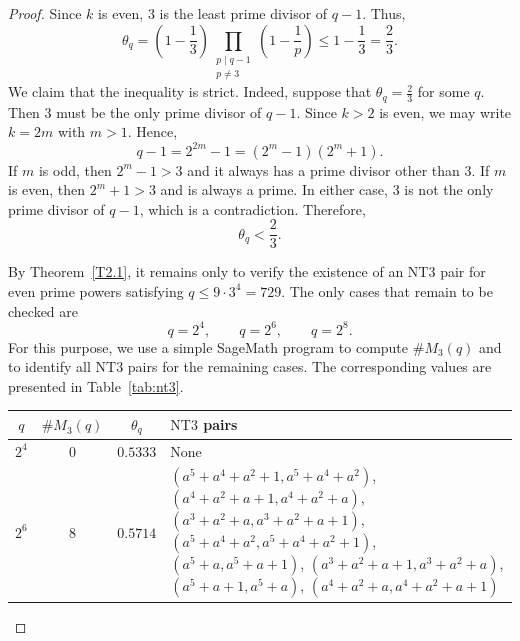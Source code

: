 \documentclass[12pt]{amsart}
\theoremstyle{definition}
\theoremstyle{remark}
\numberwithin{equation}{section}
\begin{document}
\begin{proof}
Since $k$ is even, $3$ is the least prime divisor of $q-1$. Thus,
\[
\theta_q
=
\left(1-\frac{1}{3}\right)
\prod_{\substack{p\mid q-1\\p\neq 3}}
\left(1-\frac{1}{p}\right)
\leq
1-\frac{1}{3}
=
\frac{2}{3}.
\]
We claim that the inequality is strict. Indeed, suppose that $\theta_q=\frac{2}{3}$ for some $q$. Then $3$ must be the only prime divisor of $q-1$. Since $k>2$ is even, we may write $k=2m$ with $m>1$. Hence,
\[
q-1=2^{2m}-1=(2^m-1)(2^m+1).
\]
If $m$ is odd, then $2^m-1>3$ and it always has a prime divisor other than $3$. If $m$ is even, then $2^m+1>3$ and is always a prime. In either case, $3$ is not the only prime divisor of $q-1$, which is a contradiction. Therefore,
\[
\theta_q<\frac{2}{3}.
\]

By Theorem~\ref{T2.1}, it remains only to verify the existence of an $\mathrm{NT}3$ pair for even prime powers satisfying $q\leq 9\cdot 3^4=729$.
The only cases that remain to be checked are
\[
q=2^4,\qquad q=2^6,\qquad q=2^8.
\]
For this purpose, we use a simple SageMath program to compute $\#M_3(q)$ and to identify all $\mathrm{NT}3$ pairs for the remaining cases. The corresponding values are presented in Table~\ref{tab:nt3}.

\begin{table}[h]
\centering
\scriptsize
\begin{tabular}{c|c|c|p{9cm}}
$q$ & $\#M_3(q)$ & $\theta_q$ & $\mathrm{NT}3$ pairs \\ \hline
$2^4$ & $0$ & $0.5333$ & None \\[2mm]

$2^6$ & $8$ & $0.5714$ &
$\left(a^5+a^4+a^2+1,a^5+a^4+a^2\right)$,
$\left(a^4+a^2+a+1,a^4+a^2+a\right)$,
$\left(a^3+a^2+a,a^3+a^2+a+1\right)$,
$\left(a^5+a^4+a^2,a^5+a^4+a^2+1\right)$,
$\left(a^5+a,a^5+a+1\right)$,
$\left(a^3+a^2+a+1,a^3+a^2+a\right)$,
$\left(a^5+a+1,a^5+a\right)$,
$\left(a^4+a^2+a,a^4+a^2+a+1\right)$ \\[3mm]


\end{tabular}
\end{table}
\end{proof}
\end{document}
